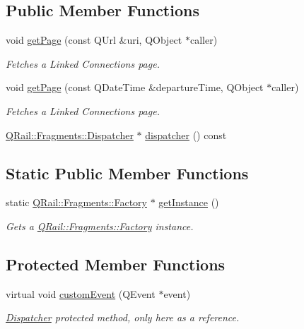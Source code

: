 \subsection*{Public Member Functions}
\begin{DoxyCompactItemize}
\item 
void \mbox{\hyperlink{classQRail_1_1Fragments_1_1Factory_ae603b69714d209caee04f7024c39548b}{get\+Page}} (const Q\+Url \&uri, Q\+Object $\ast$caller)
\begin{DoxyCompactList}\small\item\em Fetches a Linked Connections page. \end{DoxyCompactList}\item 
void \mbox{\hyperlink{classQRail_1_1Fragments_1_1Factory_a9a1ad3f27d325db60b7221fe4124353a}{get\+Page}} (const Q\+Date\+Time \&departure\+Time, Q\+Object $\ast$caller)
\begin{DoxyCompactList}\small\item\em Fetches a Linked Connections page. \end{DoxyCompactList}\item 
\mbox{\hyperlink{classQRail_1_1Fragments_1_1Dispatcher}{Q\+Rail\+::\+Fragments\+::\+Dispatcher}} $\ast$ \mbox{\hyperlink{classQRail_1_1Fragments_1_1Factory_a32781d890e698f2daed981510c72287c}{dispatcher}} () const
\end{DoxyCompactItemize}
\subsection*{Static Public Member Functions}
\begin{DoxyCompactItemize}
\item 
static \mbox{\hyperlink{classQRail_1_1Fragments_1_1Factory}{Q\+Rail\+::\+Fragments\+::\+Factory}} $\ast$ \mbox{\hyperlink{classQRail_1_1Fragments_1_1Factory_a26ad4dba8c552d6a9920c5a8cbbc2af9}{get\+Instance}} ()
\begin{DoxyCompactList}\small\item\em Gets a \mbox{\hyperlink{classQRail_1_1Fragments_1_1Factory}{Q\+Rail\+::\+Fragments\+::\+Factory}} instance. \end{DoxyCompactList}\end{DoxyCompactItemize}
\subsection*{Protected Member Functions}
\begin{DoxyCompactItemize}
\item 
virtual void \mbox{\hyperlink{classQRail_1_1Fragments_1_1Factory_a251a17b7e9ff13102ecbaa96a42a660f}{custom\+Event}} (Q\+Event $\ast$event)
\begin{DoxyCompactList}\small\item\em \mbox{\hyperlink{classQRail_1_1Fragments_1_1Dispatcher}{Dispatcher}} protected method, only here as a reference. \end{DoxyCompactList}\end{DoxyCompactItemize}


